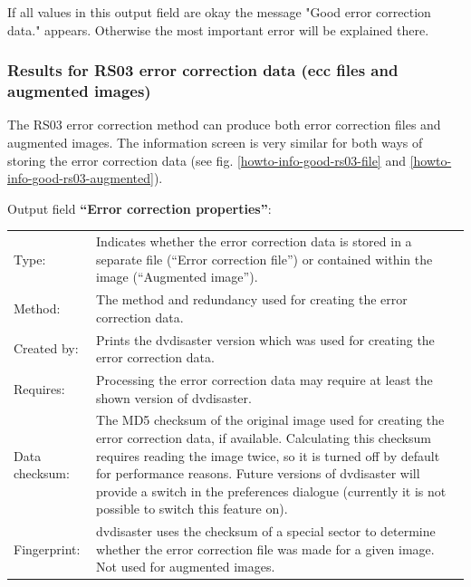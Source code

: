 \bigskip

If all values in this output field are okay the
message "\textcolor{dkgreen}{Good error correction data.}" appears.
Otherwise the most important error will be explained there.

\subsubsection{Results for RS03 error correction data (ecc files and augmented images)}
\label{howto-info-rs03}

The RS03 error correction method can produce both error correction files
and augmented images. The information screen is very similar for both ways
of storing the error correction data (see fig. \ref{howto-info-good-rs03-file}
and  \ref{howto-info-good-rs03-augmented}).

\bigskip

Output field {\bf ``Error correction properties''}:

\medskip

\begin{tabular}{lp{126mm}}
  Type: &
  Indicates whether the error correction data is stored
  in a separate file (``Error correction file'') or contained
  within the image (``Augmented image''). \\
 	
  Method: &
  The method and redundancy used for creating the error correction data. \\
 	
  Created by: &
  Prints the dvdisaster version which was used for creating the error correction data. \\
 	
  Requires: &
  Processing the error correction data may require at least the shown version
  of dvdisaster. \\
 	
  Data checksum: &
  The MD5 checksum of the original image used for creating
  the error correction data, if available. Calculating this
  checksum requires reading the image twice, so it is turned off by default
  for performance reasons. Future versions of dvdisaster will provide a switch
  in the preferences dialogue (currently it is not possible to switch this feature on).\\

  Fingerprint: &
  dvdisaster uses the checksum of a special sector to determine 
  whether the error correction file was made for a given image.
  Not used for augmented images.\\

\end{tabular}

